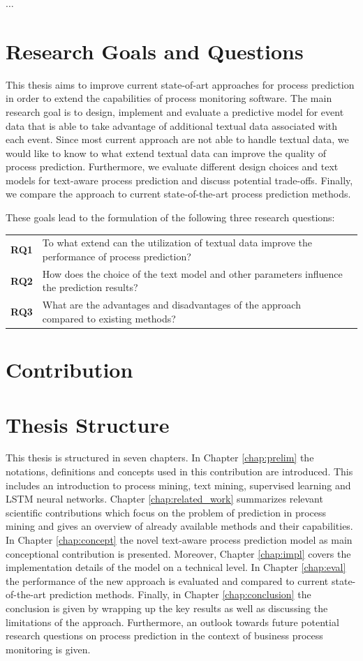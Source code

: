 $\dots$

\section{Research Goals and Questions}

This thesis aims to improve current state-of-art approaches for process prediction in order to extend the capabilities of process monitoring software.
The main research goal is to design, implement and evaluate a predictive model for event data that is able to take advantage of additional textual data associated with each event.
Since most current approach are not able to handle textual data, we would like to know to what extend textual data can improve the quality of process prediction.
Furthermore, we evaluate different design choices and text models for text-aware process prediction and discuss potential trade-offs.
Finally, we compare the approach to current state-of-the-art process prediction methods.

These goals lead to the formulation of the following three research questions:

\begin{tabularx}{\textwidth}{llX}
	\textbf{RQ1} & To what extend can the utilization of textual data improve the performance of process prediction? \\
	\textbf{RQ2} & How does the choice of the text model and other parameters influence the prediction results?\\
	\textbf{RQ3} & What are the advantages and disadvantages of the approach compared to existing methods?
\end{tabularx}

\section{Contribution}



\section{Thesis Structure}

This thesis is structured in seven chapters.
In Chapter \ref{chap:prelim} the notations, definitions and concepts used in this contribution are introduced.
This includes an introduction to process mining, text mining, supervised learning and LSTM neural networks.
Chapter \ref{chap:related_work} summarizes relevant scientific contributions which focus on the problem of prediction in process mining and gives an overview of already available methods and their capabilities.
In Chapter \ref{chap:concept} the novel text-aware process prediction model as main conceptional contribution is presented.
Moreover, Chapter \ref{chap:impl} covers the implementation details of the model on a technical level.
In Chapter \ref{chap:eval} the performance of the new approach is evaluated and compared to current state-of-the-art prediction methods.
Finally, in Chapter \ref{chap:conclusion} the conclusion is given by wrapping up the key results as well as discussing the limitations of the approach.
Furthermore, an outlook towards future potential research questions on process prediction in the context of business process monitoring is given.
